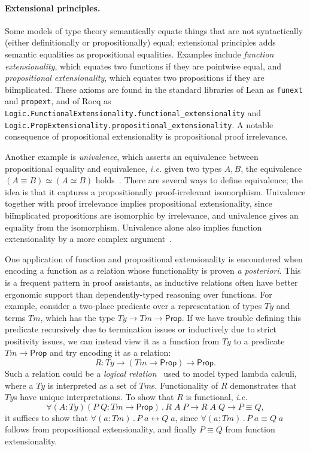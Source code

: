 \documentclass{article}
\makeatletter
\newcommand{\ie}{\textit{i.e.}\@\xspace}
\newcommand{\apost}{\textit{a posteriori}\@\xspace}
\newcommand{\kw}[1]{\mathsf{#1}}
\newcommand{\code}[1]{\texttt{#1}}
\makeatother
\begin{document}
\paragraph{Extensional principles.}
Some models of type theory semantically equate things
that are not syntactically (either definitionally or propositionally) equal;
extensional principles adds semantic equalities as propositional equalities.
Examples include \emph{function extensionality},
which equates two functions if they are pointwise equal,
and \emph{propositional extensionality},
which equates two propositions if they are bi\"implicated.
These axioms are found in the standard libraries of Lean as \code{funext} and \code{propext},
and of Rocq as \code{Logic.{\allowbreak}FunctionalExtensionality.{\allowbreak}functional\_{\allowbreak}extensionality}
and \code{Logic.{\allowbreak}PropExtensionality.{\allowbreak}propositional\_{\allowbreak}extensionality}.
A notable consequence of propositional extensionality is propositional proof irrelevance.

Another example is \emph{univalence},
which asserts an equivalence between propositional equality and equivalence,
\ie given two types $A, B$,
the equivalence $(A \equiv B) \simeq (A \simeq B)$ holds~\citep{hott}.
There are several ways to define equivalence;
the idea is that it captures a propositionally proof-irrelevant isomorphism.
Univalence together with proof irrelevance implies propositional extensionality,
since bi\"implicated propositions are isomorphic by irrelevance,
and univalence gives an equality from the isomorphism.
Univalence alone also implies function extensionality
by a more complex argument~\cite[Chapter 4.9]{hott}.

One application of function and propositional extensionality
is encountered when encoding a function as a relation
whose functionality is proven \apost.
This is a frequent pattern in proof assistants,
as inductive relations often have better ergonomic support
than dependently-typed reasoning over functions.
For example, consider a two-place predicate over
a representation of types $\mathit{Ty}$ and terms $\mathit{Tm}$,
which has the type $\mathit{Ty} \to \mathit{Tm} \to \kw{Prop}$.
If we have trouble defining this predicate recursively due to termination issues
or inductively due to strict positivity issues,
we can instead view it as a function from $\mathit{Ty}$
to a predicate $\mathit{Tm} \to \kw{Prop}$ and try encoding it as a relation:
$$R : \mathit{Ty} \to (\mathit{Tm} \to \kw{Prop}) \to \kw{Prop}.$$
Such a relation could be a \emph{logical relation}~\citep{logrel}
used to model typed lambda calculi,
where a $\mathit{Ty}$ is interpreted as a set of $\mathit{Tm}$s.
Functionality of $R$ demonstrates that $\mathit{Ty}$s have unique interpretations.
To show that $R$ is functional, \ie
$$\forall (A : \mathit{Ty}) (P \; Q : \mathit{Tm} \to \kw{Prop}) \mathpunct{.}
  R \; A \; P \to R \; A \; Q \to P \equiv Q,$$
it suffices to show that
$\forall (a : \mathit{Tm})\mathpunct{.} P \; a \leftrightarrow Q \; a$,
since $\forall (a : \mathit{Tm})\mathpunct{.} P \; a \equiv Q \; a$
follows from propositional extensionality,
and finally $P \equiv Q$ from function extensionality.
\end{document}
